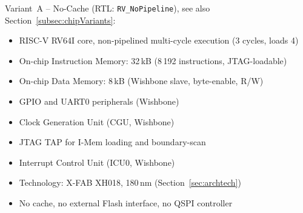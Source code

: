 Variant~A -- No-Cache (RTL: \texttt{RV\_NoPipeline}), see also Section~\ref{subsec:chipVariants}:
\begin{itemize}
  \item RISC-V RV64I core, non-pipelined multi-cycle execution (3 cycles, loads 4)
  \item On-chip Instruction Memory: 32\,kB (8\,192 instructions, JTAG-loadable)
  \item On-chip Data Memory: 8\,kB (Wishbone slave, byte-enable, R/W)
  \item GPIO and UART0 peripherals (Wishbone)
  \item Clock Generation Unit (CGU, Wishbone)
  \item JTAG TAP for I-Mem loading and boundary-scan
  \item Interrupt Control Unit (ICU0, Wishbone)
  \item Technology: X-FAB XH018, 180\,nm (Section~\ref{sec:archtech})
  \item No cache, no external Flash interface, no QSPI controller
\end{itemize}
